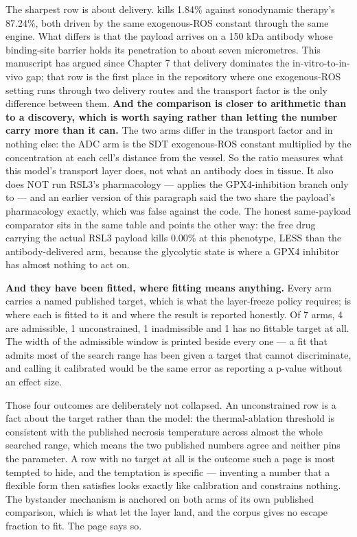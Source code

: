 \documentclass[11pt,twoside,openright]{report}
\begin{document}
The sharpest row is about delivery.  kills 1.84\% against sonodynamic therapy's 87.24\%, both driven by the same exogenous-ROS constant through the same engine. What differs is that the payload arrives on a 150 kDa antibody whose binding-site barrier holds its penetration to about seven micrometres. This manuscript has argued since Chapter 7 that delivery dominates the in-vitro-to-in-vivo gap; that row is the first place in the repository where one exogenous-ROS setting runs through two delivery routes and the transport factor is the only difference between them. \textbf{And the comparison is closer to arithmetic than to a discovery, which is worth saying rather than letting the number carry more than it can.} The two arms differ in the transport factor and in nothing else: the ADC arm is the SDT exogenous-ROS constant multiplied by the concentration at each cell's distance from the vessel. So the ratio measures what this model's transport layer does, not what an antibody does in tissue. It also does NOT run RSL3's pharmacology ---  applies the GPX4-inhibition branch only to  --- and an earlier version of this paragraph said the two share the payload's pharmacology exactly, which was false against the code. The honest same-payload comparator sits in the same table and points the other way: the free drug carrying the actual RSL3 payload kills 0.00\% at this phenotype, LESS than the antibody-delivered arm, because the glycolytic state is where a GPX4 inhibitor has almost nothing to act on.

\textbf{And they have been fitted, where fitting means anything.} Every arm carries a named published target, which is what the layer-freeze policy requires;  is where each is fitted to it and where the result is reported honestly. Of 7 arms, 4 are admissible, 1 unconstrained, 1 inadmissible and 1 has no fittable target at all. The width of the admissible window is printed beside every one --- a fit that admits most of the search range has been given a target that cannot discriminate, and calling it calibrated would be the same error as reporting a p-value without an effect size.

Those four outcomes are deliberately not collapsed. An unconstrained row is a fact about the target rather than the model: the thermal-ablation threshold is consistent with the published necrosis temperature across almost the whole searched range, which means the two published numbers agree and neither pins the parameter. A row with no target at all is the outcome such a page is most tempted to hide, and the temptation is specific --- inventing a number that a flexible form then satisfies looks exactly like calibration and constrains nothing. The bystander mechanism is anchored on both arms of its own published comparison, which is what let the layer land, and the corpus gives no escape fraction to fit. The page says so.
\end{document}
